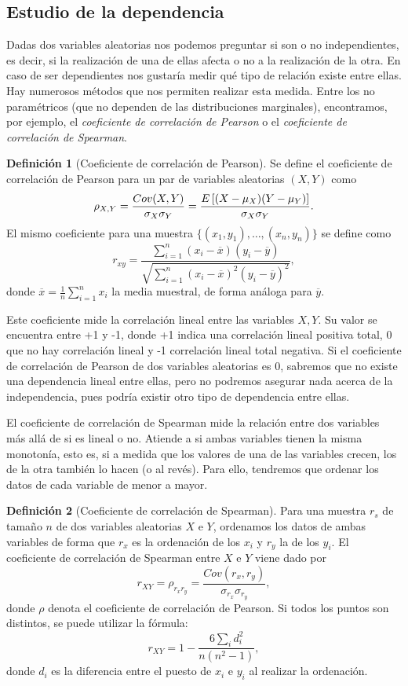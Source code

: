 \documentclass[10pt,a4paper]{article} %
\let\mathbb\relax
\theoremstyle{definition}
\newtheorem{definition}{Definición}[section]
\begin{document}
\subsection{Estudio de la dependencia}

Dadas dos variables aleatorias nos podemos preguntar si son o no independientes, es decir, si la realización de una de ellas afecta o no a la realización de la otra. En caso de ser dependientes nos gustaría medir qué tipo de relación existe entre ellas. Hay numerosos métodos que nos permiten realizar esta medida. Entre los no paramétricos (que no dependen de las distribuciones marginales), encontramos, por ejemplo, el \textit{coeficiente de correlación de Pearson} o el \textit{coeficiente de correlación de Spearman}.

\begin{definition}[Coeficiente de correlación de Pearson]
  Se define el coeficiente de correlación de Pearson para un par de variables aleatorias $(X,Y)$ como\[
\rho_{X,Y} = \frac{Cov(X,Y)}{\sigma_X\sigma_Y} = \frac{\mathbb{E}\left [ (X- \mu_X)(Y-\mu_Y)\right ]}{\sigma_X\sigma_Y}.
\]
El mismo coeficiente para una muestra $\{(x_1,y_1),\dots,(x_n,y_n)\}$ se define como\[
r_{xy}=\frac{\sum_{i=1}^n(x_i-\overline{x})(y_i-\overline{y})}{\sqrt{\sum_{i=1}^n(x_i-\overline{x})^2(y_i-\overline{y})^2}},
\] donde $\overline{x} = \frac{1}{n}\sum_{i=1}^nx_i$ la media muestral, de forma análoga para $\overline{y}$.
\end{definition}

Este coeficiente mide la correlación lineal entre las variables $X,Y$. Su valor se encuentra entre +1 y -1, donde +1 indica una correlación lineal positiva total, 0 que no hay correlación lineal y -1 correlación lineal total negativa. Si el coeficiente de correlación de Pearson de dos variables aleatorias es 0, sabremos que no existe una dependencia lineal entre ellas, pero no podremos asegurar nada acerca de la independencia, pues podría existir otro tipo de dependencia entre ellas.

El coeficiente de correlación de Spearman mide la relación entre dos variables más allá de si es lineal o no. Atiende a si ambas variables tienen la misma monotonía, esto es, si a medida que los valores de una de las variables crecen, los de la otra también lo hacen (o al revés). Para ello, tendremos que ordenar los datos de cada variable de menor a mayor.

\begin{definition}[Coeficiente de correlación de Spearman]
  Para una muestra $r_s$ de tamaño $n$ de dos variables aleatorias $X$ e $Y$, ordenamos los datos de ambas variables de forma que $r_x$ es la ordenación de los $x_i$ y $r_y$ la de los $y_i$. El coeficiente de correlación de Spearman entre $X$ e $Y$ viene dado por\[
r_{XY}=\rho_{r_xr_y}=\frac{Cov(r_x,r_y)}{\sigma_{r_x}\sigma_{r_y}},
\] donde $\rho$ denota el coeficiente de correlación de Pearson. Si todos los puntos son distintos, se puede utilizar la fórmula:\[
r_{XY} = 1 - \frac{6\sum_i d_i^2}{n(n^2-1)},
\]donde $d_i$ es la diferencia entre el puesto de $x_i$ e $y_i$ al realizar la ordenación.
\end{definition}
\end{document}

